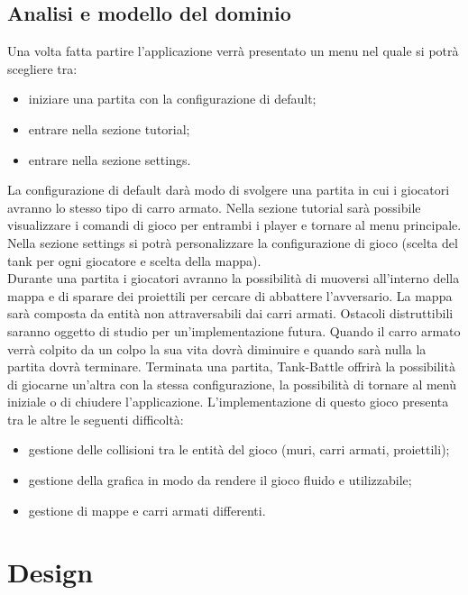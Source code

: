 \documentclass[a4paper,12pt]{report}
\begin{document}
\section{Analisi e modello del dominio}
Una volta fatta partire l’applicazione verrà presentato un menu nel quale si potrà scegliere tra:
\begin{itemize}
	\item iniziare una partita con la configurazione di default;
	\item entrare nella sezione tutorial;
	\item entrare nella sezione settings.
\end{itemize}
La configurazione di default darà modo di svolgere una partita in cui i giocatori avranno lo stesso tipo di carro armato.
Nella sezione tutorial sarà possibile visualizzare i comandi di gioco per entrambi i player e tornare al menu principale.
Nella sezione settings si potrà personalizzare la configurazione di gioco (scelta del tank per ogni giocatore e scelta della mappa).\\
Durante una partita i giocatori avranno la possibilità di muoversi all’interno della mappa e di sparare dei proiettili per cercare di abbattere l’avversario.
La mappa sarà composta da entità non attraversabili dai carri armati.
Ostacoli distruttibili saranno oggetto di studio per un’implementazione futura.
Quando il carro armato verrà colpito da un colpo la sua vita dovrà diminuire e quando sarà nulla la partita dovrà terminare.
Terminata una partita, Tank-Battle offrirà la possibilità di giocarne un’altra con la stessa configurazione, la possibilità di tornare al menù iniziale o di chiudere l’applicazione. 
L’implementazione di questo gioco presenta tra le altre le seguenti difficoltà:
\begin{itemize}
	\item gestione delle collisioni tra le entità del gioco (muri, carri armati, proiettili);
	\item gestione della grafica in modo da rendere il gioco fluido e utilizzabile;
	\item gestione di mappe e carri armati differenti.
\end{itemize}
%
\chapter{Design}
\end{document}
